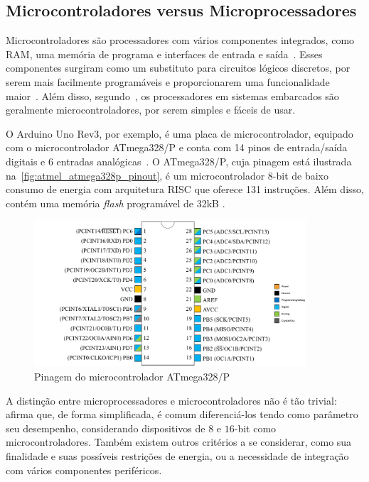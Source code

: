 \subsection{Microcontroladores versus Microprocessadores}

Microcontroladores são processadores com vários componentes integrados, como RAM, uma memória de programa e interfaces de entrada e saída~\cite{white:2011}. Esses componentes surgiram como um substituto para circuitos lógicos discretos, por serem mais facilmente programáveis e proporcionarem uma funcionalidade maior~\cite{heath:2002}. Além disso, segundo~, os processadores em sistemas embarcados são geralmente microcontroladores, por serem simples e fáceis de usar.

O Arduino Uno Rev3, por exemplo, é uma placa de microcontrolador, equipado com o microcontrolador ATmega328/P e conta com 14 pinos de entrada/saída digitais e 6 entradas analógicas~\cite{arduino:uno_store}.
% 
O ATmega328/P, cuja pinagem está ilustrada na~\autoref{fig:atmel_atmega328p_pinout}, é um microcontrolador 8-bit de baixo consumo de energia com arquitetura RISC que oferece 131 instruções. Além disso, contém uma memória \textit{flash} programável de 32kB \cite{atmel:2016atmega328p}.

\begin{figure}[ht]
	\caption{\label{fig:atmel_atmega328p_pinout}Pinagem do microcontrolador ATmega328/P}
	\begin{center}
	    \includegraphics[width=0.9\textwidth]{resources/atmel_atmega328_pinout}
	\end{center}
\end{figure}

A distinção entre microprocessadores e microcontroladores não é tão trivial:~ afirma que, de forma simplificada, é comum diferenciá-los tendo como parâmetro seu desempenho, considerando dispositivos de $8$ e $16$-bit como microcontroladores. Também existem outros critérios a se considerar, como sua finalidade e suas possíveis restrições de energia, ou a necessidade de integração com vários componentes periféricos.

